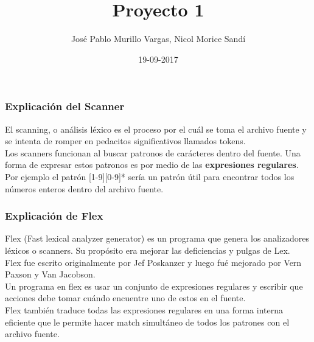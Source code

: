 \documentclass[usenames,dvipsnames]{beamer}
\title{Proyecto 1}
\author{Jos\'e Pablo Murillo Vargas, Nicol Morice Sand\'i}
\institute[VFU] 
{ 
\inst{} 
Instituto T\'ecnol\'ogico de Costa Rica 
\and 
\inst{} 
Escuela de Ingenier\'ia en Computaci\'on 
\and 
\inst{} 
Compiladores e Int\'erpretes 
}
\date{19-09-2017}
\begin{document}
 
 
\frame{\titlepage} 
 
\begin{frame} 
\frametitle{Explicaci\'on del Scanner} 
El scanning, o an\'alisis l\'exico es el proceso por el cu\'al se toma el archivo fuente y se intenta de romper en pedacitos significativos llamados tokens.\\[0.2cm] 
Los scanners funcionan al buscar patronos de car\'acteres dentro del fuente. Una forma de expresar estos patronos es por medio de las \textbf{expresiones regulares}. Por ejemplo el patrón [1-9][0-9]* ser\'ia un patr\'on \'util para encontrar todos los n\'umeros enteros dentro del archivo fuente. 
\end{frame} 
 
\begin{frame} 
\frametitle{Explicaci\'on de Flex} 
Flex (Fast lexical analyzer generator) es un programa que genera los analizadores l\'exicos o scanners. Su prop\'osito era mejorar las deficiencias y pulgas de Lex. \\[0.2cm] 
Flex fue escrito originalmente por Jef Poskanzer y luego fu\'e mejorado por Vern Paxson y Van Jacobson. \\[0.2cm] 
Un programa en flex es usar un conjunto de expresiones regulares y escribir que acciones debe tomar cu\'ando encuentre uno de estos en el fuente.\\[0.2cm] 
Flex tambi\'en traduce todas las expresiones regulares en una forma interna eficiente que le permite hacer match simult\'aneo de todos los patrones con el archivo fuente. 
\end{frame} 
 
\end{document}
